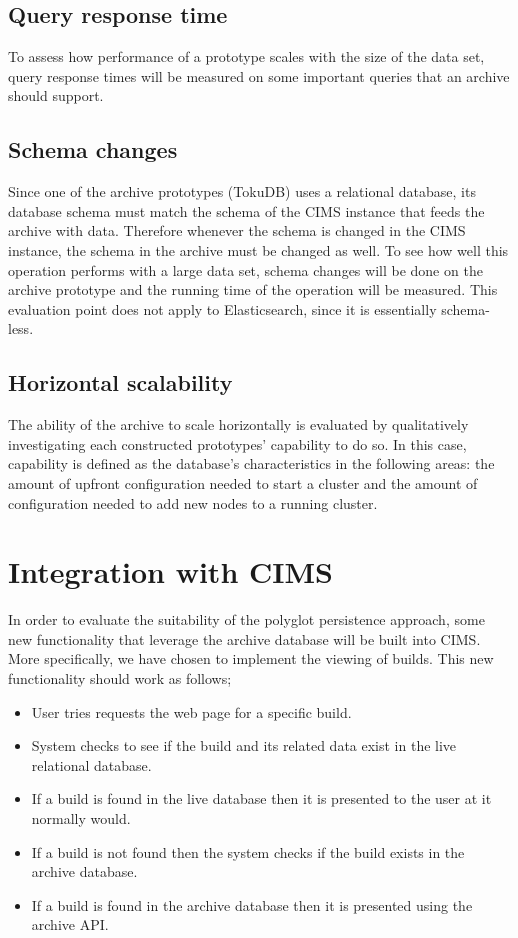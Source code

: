 \subsection{Query response time}
To assess how performance of a prototype scales with the size of the data set, query response times will be measured on some important queries that an archive should support.

\subsection{Schema changes}
Since one of the archive prototypes (TokuDB) uses a relational database, its database schema must match the schema of the CIMS instance that feeds the archive with data. Therefore whenever the schema is changed in the CIMS instance, the schema in the archive must be changed as well. To see how well this operation performs with a large data set, schema changes will be done on the archive prototype and the running time of the operation will be measured. This evaluation point does not apply to Elasticsearch, since it is essentially schema-less.

\subsection{Horizontal scalability}
The ability of the archive to scale horizontally is evaluated by qualitatively investigating each constructed prototypes' capability to do so. In this case, capability is defined as the database's characteristics in the following areas: the amount of upfront configuration needed to start a cluster and the amount of configuration needed to add new nodes to a running cluster.

\section{Integration with CIMS}
In order to evaluate the suitability of the polyglot persistence approach, some new functionality that leverage the archive database will be built into CIMS. More specifically, we have chosen to implement the viewing of builds. This new functionality should work as follows;
\begin{itemize}
\item User tries requests the web page for a specific build.
\item System checks to see if the build and its related data exist in the live relational database.
\item If a build is found in the live database then it is presented to the user at it normally would.
\item If a build is not found then the system checks if the build exists in the archive database. 
\item If a build is found in the archive database then it is presented using the archive API. 
\end{itemize}


